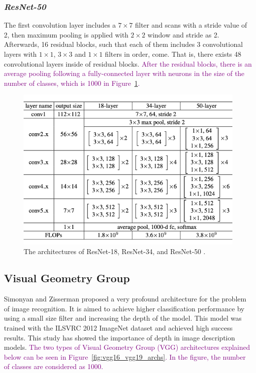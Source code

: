 \subsubsection*{\textit{ResNet-50}}

The first convolution layer includes a $7 \times 7$ filter and scans with a stride value of 2, then maximum pooling is applied with  $2 \times 2 $ window and stride as 2. Afterwards, 16 residual blocks, such that each of them includes 3 convolutional layers with $1 \times 1$, $3 \times 3$ and $1 \times 1$ filters in order, come. That is, there exists 48 convolutional layers inside of residual blocks. \textcolor{purple}{After the residual blocks, there is an average pooling following a fully-connected layer with neurons in the size of the number of classes, which is 1000 in Figure~\ref{fig:resnet_archs}.}
 
\begin{figure}[h]
    \centering
    \includegraphics[width=\linewidth]{fig/resnet_archs.png}
    \vspace*{1mm}
    \caption{The architectures of ResNet-18, ResNet-34, and ResNet-50 \cite{ResNet}.}
    \label{fig:resnet_archs}
\end{figure}


\subsection{Visual Geometry Group}

Simonyan and Zisserman \cite{VGG} proposed a very profound architecture for the problem of image recognition. It is aimed to achieve higher classification performance by using a small size filter and increasing the depth of the model. This model was trained with the ILSVRC 2012  ImageNet \cite{imagenet} dataset and achieved high success results. This study has showed the importance of depth in image description models. \textcolor{purple}{The two types of Visual Geometry Group (VGG) architectures explained below can be seen in Figure~\ref{fig:vgg16_vgg19_archs}. In the figure, the number of classes are considered as 1000.}

